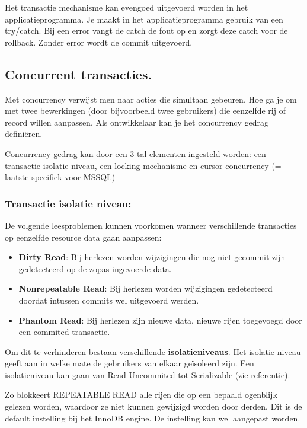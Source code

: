 \documentclass{article}
\newcommand{\bold}[1]{\textbf{#1}}
\begin{document}
Het transactie mechanisme kan evengoed uitgevoerd worden in het applicatieprogramma. Je maakt in het
applicatieprogramma gebruik van een try/catch. Bij een error vangt de catch de fout op en zorgt deze catch voor de
rollback. Zonder error wordt de commit uitgevoerd.

\subsection{Concurrent transacties.}

Met concurrency verwijst men naar acties die simultaan gebeuren. Hoe ga je om met twee bewerkingen (door
bijvoorbeeld twee gebruikers) die eenzelfde rij of record willen aanpassen. Als ontwikkelaar kan je het concurrency
gedrag definiëren. 

Concurrency gedrag kan door een 3-tal elementen ingesteld worden: een transactie isolatie
niveau, een locking mechanisme en cursor concurrency (= laatste specifiek voor MSSQL)

\subsubsection{Transactie isolatie niveau:}
De volgende leesproblemen kunnen voorkomen wanneer verschillende transacties op eenzelfde resource
data gaan aanpassen:

\begin{itemize}
    \item \bold{Dirty Read}: Bij herlezen worden wijzigingen die nog niet gecommit zijn gedetecteerd op de zopas ingevoerde data.
    \item \bold{Nonrepeatable Read}: Bij herlezen worden wijzigingen gedetecteerd doordat intussen commits wel uitgevoerd werden.
    \item \bold{Phantom Read}: Bij herlezen zijn nieuwe data, nieuwe rijen toegevoegd door een commited transactie.
\end{itemize}

Om dit te verhinderen bestaan verschillende \bold{isolatieniveaus}. Het isolatie niveau geeft aan in welke mate de
gebruikers van elkaar geïsoleerd zijn. Een isolatieniveau kan gaan van Read Uncommited tot Serializable (zie
referentie).

Zo blokkeert REPEATABLE READ alle rijen die op een bepaald ogenblijk gelezen worden, waardoor ze niet kunnen
gewijzigd worden door derden. Dit is de default instelling bij het InnoDB engine. De instelling kan wel aangepast
worden.
\end{document}
